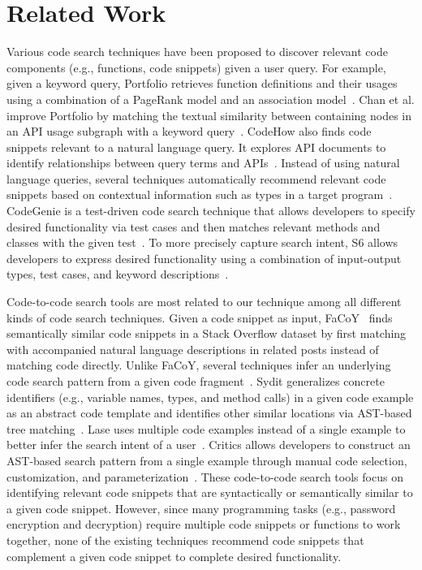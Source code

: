 \section{Related Work}
\label{sec:related}
Various code search techniques have been proposed to discover relevant code components (e.g., functions, code snippets) given a user query. For example, given a keyword query, Portfolio retrieves function definitions and their usages using a combination of a PageRank model and an association model~\cite{mcmillan2011portfolio}. Chan et al. improve Portfolio by matching the textual similarity between containing nodes in an API usage subgraph with a keyword query~\cite{chan2012searching}. CodeHow also finds code snippets relevant to a natural language query. It explores API documents to identify relationships between query terms and APIs~\cite{lv2015codehow}. Instead of using natural language queries, several techniques automatically recommend relevant code snippets based on contextual information such as types in a target program~\cite{Holmes2005, sahavechaphan2006xsnippet, thummalapenta2007parseweb, ponzanelli2014mining}. CodeGenie is a test-driven code search technique that allows developers to specify desired functionality via test cases and then matches relevant methods and classes with the given test~\cite{lazzarini2009applying}. To more precisely capture search intent, S6 allows developers to express desired functionality using a combination of input-output types, test cases, and keyword descriptions~\cite{reiss2009semantics}.

Code-to-code search tools are most related to our technique among all different kinds of code search techniques. Given a code snippet as input, FaCoY~\cite{kim2018Facoy} finds semantically similar code snippets in a Stack Overflow dataset by first matching with accompanied natural language descriptions in related posts instead of matching code directly. Unlike FaCoY, several techniques infer an underlying code search pattern from a given code fragment~\cite{zhang2015interactive, MKM:11, meng2013lase, sivaraman2019active}. Sydit generalizes concrete identifiers (e.g., variable names, types, and method calls) in a given code example as an abstract code template and identifies other similar locations via AST-based tree matching~\cite{MKM:11}. Lase uses multiple code examples instead of a single example to better infer the search intent of a user~\cite{meng2013lase}. Critics allows developers to construct an AST-based search pattern from a single example through manual code selection, customization, and parameterization~\cite{zhang2015interactive}. These code-to-code search tools focus on identifying relevant code snippets that are syntactically or semantically similar to a given code snippet. However, since many programming tasks (e.g., password encryption and decryption) require multiple code snippets or functions to work together, none of the existing techniques recommend code snippets that complement a given code snippet to complete desired functionality.
